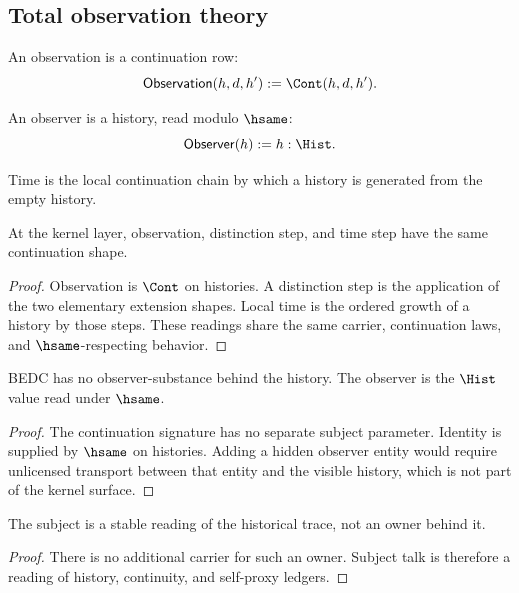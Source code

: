 \subsection{Total observation theory}
\label{subsec:philosophy-total-observation}

\begin{definition}[Observation]
\label{def:philosophy-observation-total}
An observation is a continuation row:
$$
\mathsf{Observation}(h,d,h') := \Cont(h,d,h').
$$
\end{definition}

\begin{definition}[Observer]
\label{def:philosophy-observer-total}
An observer is a history, read modulo \(\hsame\):
$$
\mathsf{Observer}(h) := h : \Hist.
$$
\end{definition}

\begin{definition}[Time]
\label{def:philosophy-time-total}
Time is the local continuation chain by which a history is generated
from the empty history.
\end{definition}

\begin{theorem}
\label{thm:philosophy-observation-distinction-time-total}
At the kernel layer, observation, distinction step, and time step have
the same continuation shape.
\end{theorem}
\begin{proof}
Observation is \(\Cont\) on histories. A distinction step is the
application of the two elementary extension shapes. Local time is the
ordered growth of a history by those steps. These readings share the
same carrier, continuation laws, and \(\hsame\)-respecting behavior.
\end{proof}

\begin{theorem}
\label{thm:philosophy-observer-is-history-total}
BEDC has no observer-substance behind the history. The observer is the
\(\Hist\) value read under \(\hsame\).
\end{theorem}
\begin{proof}
The continuation signature has no separate subject parameter. Identity
is supplied by \(\hsame\) on histories. Adding a hidden observer entity
would require unlicensed transport between that entity and the visible
history, which is not part of the kernel surface.
\end{proof}

\begin{corollary}
\label{cor:philosophy-subject-not-substance-total}
The subject is a stable reading of the historical trace, not an owner
behind it.
\end{corollary}
\begin{proof}
There is no additional carrier for such an owner. Subject talk is
therefore a reading of history, continuity, and self-proxy ledgers.
\end{proof}

